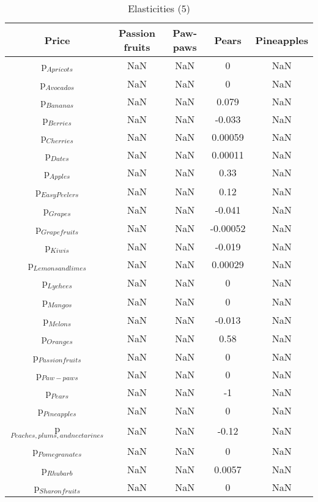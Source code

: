 \documentclass[11pt]{article}
\begin{document}
\begin{table}[h]
\caption{Elasticities (5)}
\label{Table: elasticities 5}
\begin{center}
\begin{tabular}{ccccc}
Price & Passion fruits & Paw-paws & Pears & Pineapples \\ \hline
p$_{Apricots}$ & NaN & NaN & 0 & NaN \\ 
p$_{Avocados}$ & NaN & NaN & 0 & NaN \\ 
p$_{Bananas}$ & NaN & NaN & 0.079 & NaN \\ 
p$_{Berries}$ & NaN & NaN & -0.033 & NaN \\ 
p$_{Cherries}$ & NaN & NaN & 0.00059 & NaN \\ 
p$_{Dates}$ & NaN & NaN & 0.00011 & NaN \\ 
p$_{Apples}$ & NaN & NaN & 0.33 & NaN \\ 
p$_{Easy Peelers}$ & NaN & NaN & 0.12 & NaN \\ 
p$_{Grapes}$ & NaN & NaN & -0.041 & NaN \\ 
p$_{Grapefruits}$ & NaN & NaN & -0.00052 & NaN \\ 
p$_{Kiwis}$ & NaN & NaN & -0.019 & NaN \\ 
p$_{Lemons and limes}$ & NaN & NaN & 0.00029 & NaN \\ 
p$_{Lychees}$ & NaN & NaN & 0 & NaN \\ 
p$_{Mangos}$ & NaN & NaN & 0 & NaN \\ 
p$_{Melons}$ & NaN & NaN & -0.013 & NaN \\ 
p$_{Oranges}$ & NaN & NaN & 0.58 & NaN \\ 
p$_{Passion fruits}$ & NaN & NaN & 0 & NaN \\ 
p$_{Paw-paws}$ & NaN & NaN & 0 & NaN \\ 
p$_{Pears}$ & NaN & NaN & -1 & NaN \\ 
p$_{Pineapples}$ & NaN & NaN & 0 & NaN \\ 
p$_{Peaches, plums, and nectarines}$ & NaN & NaN & -0.12 & NaN \\ 
p$_{Pomegranates}$ & NaN & NaN & 0 & NaN \\ 
p$_{Rhubarb}$ & NaN & NaN & 0.0057 & NaN \\ 
p$_{Sharon fruits}$ & NaN & NaN & 0 & NaN \\ 
\end{tabular}
\end{center}
\end{table}
\end{document}

